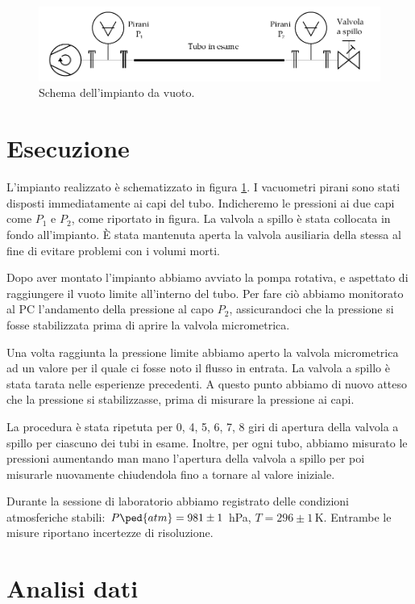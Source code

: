 \begin{figure}[b]
    \includegraphics[width=160mm]{drawing.pdf}
    \caption{Schema dell'impianto da vuoto.}
    \label{fig:schema}
\end{figure}

\section{Esecuzione}

L'impianto realizzato è schematizzato in figura \ref{fig:schema}. I vacuometri pirani sono stati disposti
immediatamente ai capi del tubo. Indicheremo le pressioni ai due capi come $P_1$ e $P_2$, come riportato in figura.
La valvola a spillo è stata collocata in fondo all'impianto. È stata mantenuta
aperta la valvola ausiliaria della stessa al fine di evitare problemi con i volumi morti. 

Dopo aver montato l'impianto abbiamo avviato la pompa rotativa, e aspettato di raggiungere il vuoto limite all'interno
del tubo. Per fare ciò abbiamo monitorato al PC l'andamento della pressione al capo $P_2$, assicurandoci che la pressione
si fosse stabilizzata prima di aprire la valvola micrometrica.

Una volta raggiunta la pressione limite abbiamo aperto la valvola micrometrica ad un valore per il quale ci fosse noto
il flusso in entrata. La valvola a spillo è stata tarata nelle esperienze precedenti. A questo punto abbiamo di nuovo
atteso che la pressione si stabilizzasse, prima di misurare la pressione ai capi. 

La procedura è stata ripetuta per 0, 4, 5, 6, 7, 8 giri di apertura della valvola a spillo per ciascuno dei
tubi in esame. Inoltre, per ogni tubo, abbiamo misurato le pressioni aumentando man mano l'apertura della valvola
a spillo per poi misurarle nuovamente chiudendola fino a tornare al valore iniziale.

Durante la sessione di laboratorio abbiamo registrato delle condizioni atmosferiche stabili: $P\ped{atm} = 981 \pm 1$ hPa,
$T = 296 \pm 1 \, \si{\kelvin}$. Entrambe le misure riportano incertezze di risoluzione.

\section{Analisi dati}

